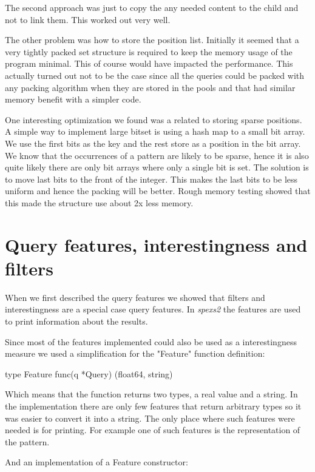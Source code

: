 The second approach was just to copy the any needed content to the child and not to link them. This worked out very well.

The other problem was how to store the position list. Initially it seemed that a very tightly packed set structure is required to keep the memory usage of the program minimal. This of course would have impacted the performance. This actually turned out not to be the case since all the queries could be packed with any packing algorithm when they are stored in the pools and that had similar memory benefit with a simpler code.

One interesting optimization we found was a related to storing sparse positions. A simple way to implement large bitset is using a hash map to a small bit array. We use the first bits as the key and the rest store as a position in the bit array. We know that the occurrences of a pattern are likely to be sparse, hence it is also quite likely there are only bit arrays where only a single bit is set. The solution is to move last bits to the front of the integer. This makes the last bits to be less uniform and hence the packing will be better. Rough memory testing showed that this made the structure use about 2x less memory.

\section{Query features, interestingness and filters}

When we first described the query features we showed that filters and interestingness are a special case query features. In \emph{spexs2} the features are used to print information about the results.

Since most of the features implemented could also be used as a interestingness measure we used a simplification for the "Feature" function definition:

\begin{file}
type Feature func(q *Query) (float64, string)
\end{file}

Which means that the function returns two types, a real value and a string. In the implementation there are only few features that return arbitrary types so it was easier to convert it into a string. The only place where such features were needed is for printing. For example one of such features is the representation of the pattern.

And an implementation of a Feature constructor:

